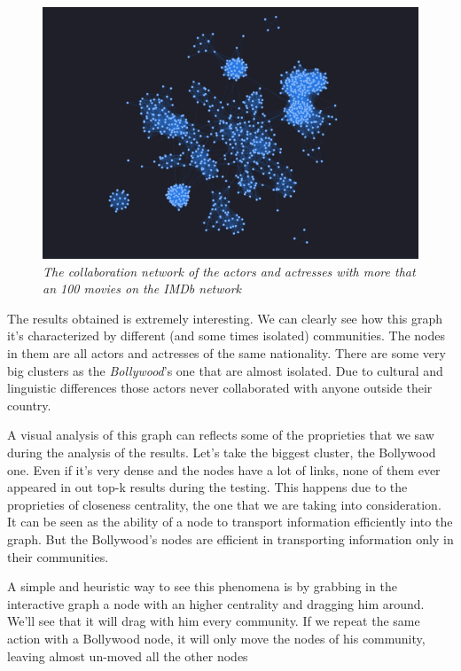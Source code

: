 \begin{center}
    \s \nd {}
\end{center}

\begin{figure}[H] \label{imdb-a-network}
    \centering
    \includegraphics[width=13cm]{Screenshot.png}
    \caption{\emph{The collaboration network of the actors and actresses with more that an 100 movies on the IMDb network}}
\end{figure}

The results obtained is extremely interesting. We can clearly see how this graph it's characterized by different (and some times isolated) communities. The nodes in them are all actors and actresses of the same nationality. There are some very big clusters as the \emph{Bollywood}'s one that are almost isolated. Due to cultural and linguistic differences those actors never collaborated with anyone outside their country. \s

A visual analysis of this graph can reflects some of the proprieties that we saw during the analysis of the results. Let's take the biggest cluster, the Bollywood one. Even if it's very dense and the nodes have a lot of links, none of them ever appeared in out top-k results during the testing. This happens due to the proprieties of closeness centrality, the one that we are taking into consideration. It can be seen as the ability of a node to transport information efficiently into the graph. But the Bollywood's nodes are efficient in transporting information only in their communities. \s

A simple and heuristic way to see this phenomena is by grabbing in the interactive graph a node with an higher centrality and dragging him around. We'll see that it will drag with him every community. If we repeat the same action with a Bollywood node, it will only move the nodes of his community, leaving almost un-moved all the other nodes
